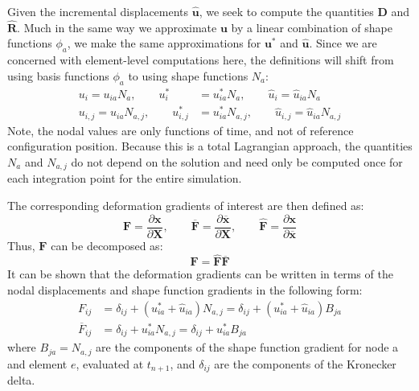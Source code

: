 Given the incremental displacements $\hat{\bm{u}}$, we seek to compute the quantities $\bm{D}$ and $\hat{\bm{R}}$. Much in the same way we approximate $\bm{u}$ by a linear combination of shape functions $\phi_a$, we make the same approximations for $\bm{u}^*$ and $\hat{\bm{u}}$. Since we are concerned with element-level computations here, the definitions will shift from using basis functions $\phi_a$ to using shape functions $N_a$:
\begin{align}
u_i = u_{ia}N_a, \qquad u^*_i &= u^*_{ia}N_a, \qquad \hat{u}_i = \hat{u}_{ia}N_a \\
u_{i,j} = u_{ia}N_{a,j}, \qquad u^*_{i,j} &= u^*_{ia}N_{a,j}, \qquad \hat{u}_{i,j} = \hat{u}_{ia}N_{a,j}
\end{align}
Note, the nodal values are only functions of time, and not of reference configuration position. Because this is a total Lagrangian approach, the quantities $N_a$ and $N_{a,j}$ do not depend on the solution and need only be computed once for each integration point for the entire simulation.

The corresponding deformation gradients of interest are then defined as:
\begin{equation}
\bm{F} = \frac{\partial \bm{x}}{\partial \bm{X}}, \qquad \bm{\overline{F}} = \frac{\partial \bm{\overline{x}}}{\partial \bm{X}}, \qquad \hat{\bm{F}} = \frac{\partial \bm{x}}{\partial \bm{\overline{x}}}
\end{equation}
Thus, $\bm{F}$ can be decomposed as:
\begin{equation}
\bm{F} = \hat{\bm{F}}\bm{\overline{F}}
\end{equation}
It can be shown that the deformation gradients can be written in terms of the nodal displacements and shape function gradients in the following form:
\begin{align}
F_{ij} &= \delta_{ij} + \left(u^*_{ia} + \hat{u}_{ia} \right) N_{a,j} = \delta_{ij} + \left(u^*_{ia} + \hat{u}_{ia} \right) B_{ja} \\
\overline{F}_{ij} &= \delta_{ij} + u^*_{ia} N_{a,j} = \delta_{ij} + u^*_{ia} B_{ja}
\end{align}
where $B_{ja} = N_{a,j}$ are the components of the shape function gradient for node a and element $e$, evaluated at $t_{n+1}$, and $\delta_{ij}$ are the components of the Kronecker delta.


